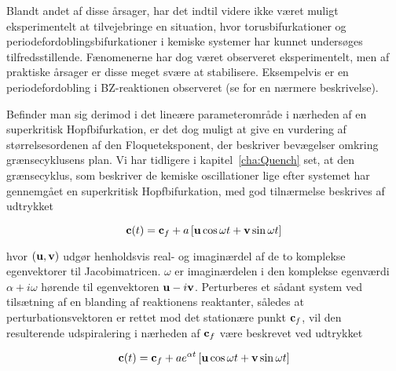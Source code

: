 \vspace{4.0mm}
Blandt andet af disse {\aa}rsager, har det indtil videre
ikke v{\ae}ret muligt eksperimentelt at tilvejebringe en
situation, hvor torusbifurkationer og
periodefordoblingsbifurkationer i kemiske sy\-stemer har
kunnet unders{\o}ges tilfredsstillende. F{\ae}nomenerne har
dog v{\ae}ret observeret eksperi\-mentelt, men af praktiske
{\aa}rsager er disse meget sv{\ae}re at stabilisere.
Eksempelvis er en periodefordobling i BZ-reaktionen
observeret (se \cite{BZPeriodDoubling} for en n{\ae}rmere
beskrivelse).

\vspace{4.0mm}
Befinder man sig derimod i det line{\ae}re
parameteromr{\aa}de i n{\ae}rheden af en superkritisk
Hopfbifurkation, er det dog muligt at give en vurdering af
st{\o}rrelses\-ordenen af den Floqueteksponent, der
beskriver bev{\ae}gelser omkring gr{\ae}nse\-cyklusens
plan. Vi har tidligere i kapitel~\ref{cha:Quench}
set, at den gr{\ae}nse\-cyklus, som beskriver de kemiske
oscillationer lige efter sy\-stemet har gennemg{\aa}et en
superkritisk Hopfbifurkation, med god tiln{\ae}rmelse
beskrives af udtrykket

\begin{equation}
 {\bf c}(t) = {\bf c}_f +
 a \left[ {\bf u}\cos \omega t + {\bf v}\sin \omega t \right]
\end{equation}

hvor $({\bf u},{\bf v})$ udg{\o}r henholdsvis real- og
imagin{\ae}rdel af de to komplekse egenvektorer til
Jacobimatricen. $\omega$ er imagin{\ae}rdelen i den
komplekse egenv{\ae}rdi $\alpha + i \omega$ h{\o}rende til
egenvektoren ${\bf u} - i{\bf v}$. Perturberes et
s{\aa}dant sy\-stem ved tils{\ae}tning af en blanding af
reaktionens reaktanter, s{\aa}ledes at perturbationsvektoren
er rettet mod det station{\ae}re punkt ${\bf c}_f$, vil den
resulterende udspiralering i n{\ae}rheden af ${\bf c}_f$
v{\ae}re beskrevet ved udtrykket

\begin{equation}
 {\bf c}(t) = {\bf c}_f + a e^{\alpha t} 
 \left[ {\bf u}\cos \omega t + {\bf v}\sin \omega t \right]
\end{equation}

